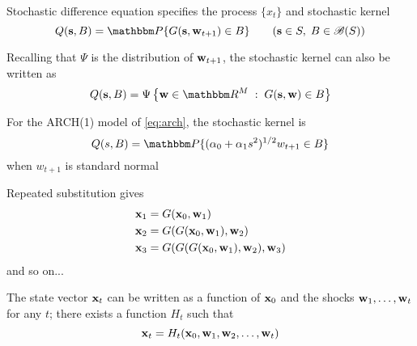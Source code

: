 \begin{frame}

    \vspace{1em}
    Stochastic difference equation specifies the process $\{x_{t}\}$ and stochastic kernel 
    \begin{equation*}
        Q(\bolds, B) = \PP\{G(\bolds, \boldw_{t+1}) \in B\}
        \qquad (\bolds \in S, \; B \in \bB(S))
    \end{equation*}
    
    \vspace{2em}
    Recalling that $\Psi$ is the distribution of ${\mathbf w}_{t+1}$,
    the stochastic kernel can also be written as 
    \begin{equation*}
        Q(\bolds, B) 
        = \Psi \left\{\boldw \in \RR^M \; : \; G(\bolds, \boldw) \in B \right\}
    \end{equation*}
    
\end{frame}

\begin{frame}

    \vspace{2em}
    \Eg
    For the ARCH(1) model of \eqref{eq:arch}, the stochastic kernel is
    \begin{equation*}
        Q(s, B) = \PP\{ (\alpha_0 + \alpha_1 s^2)^{1/2} w_{t+1} \in B \}
    \end{equation*}
    when $w_{t+1}$ is standard normal

\end{frame}

\begin{frame}

    \vspace{2em}
    Repeated substitution gives
    \begin{align*}
        {\mathbf x}_1 & = G({\mathbf x}_0, {\mathbf w}_1) \\
        {\mathbf x}_2 & = G(G({\mathbf x}_0, {\mathbf w}_1), {\mathbf w}_2) \\
        {\mathbf x}_3 & = G(G(G({\mathbf x}_0, {\mathbf w}_1), {\mathbf w}_2),{\mathbf w}_3)
    \end{align*}
    and so on...
    
    \vspace{1em}
    The state vector ${\mathbf x}_t$ can be written as a function of ${\mathbf x}_0$ and the shocks
    ${\mathbf w}_1,\ldots,{\mathbf w}_t$ for any $t$; there
    exists a function $H_t$ such that 
    \begin{equation}
        \label{eq:xaft}
        {\mathbf x}_t = H_t({\mathbf x}_0, {\mathbf w}_1, {\mathbf w}_2,\ldots, {\mathbf w}_t)
    \end{equation}

\end{frame}

